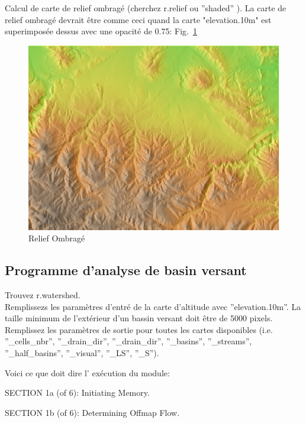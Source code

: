 Calcul de carte de relief ombrag\'e (cherchez r.relief ou ''shaded'' ).
La carte de relief ombrag\'e devrait \^etre comme ceci quand la carte "elevation.10m" est superimpos\'ee dessus avec une opacit\'e de 0.75: Fig.~\ref{fig:grass011}

\begin{figure}[htbp]
   \centering
   \includegraphics[scale=0.35]{grass011.png}
   \caption{Relief Ombrag\'e}
   \label{fig:grass011}
\end{figure}

\subsection{Programme d'analyse de basin versant}
Trouvez r.watershed.\\
Remplissezs les param\`etres d'entr\'e de la carte d'altitude avec ''elevation.10m''. La taille minimum de l'ext\'erieur d'un bassin versant doit \^etre de 5000 pixels. Remplissez les param\`etres de sortie pour toutes les cartes disponibles (i.e. ''\_cells\_nbr'', ''\_drain\_dir'', ''\_drain\_dir'', ''\_basins'', ''\_streams'', ''\_half\_basins'', ''\_visual'', ''\_LS'', ''\_S'').

Voici ce que doit dire l' ex\'ecution du module:

SECTION 1a (of 6): Initiating Memory.

SECTION 1b (of 6): Determining Offmap Flow.

